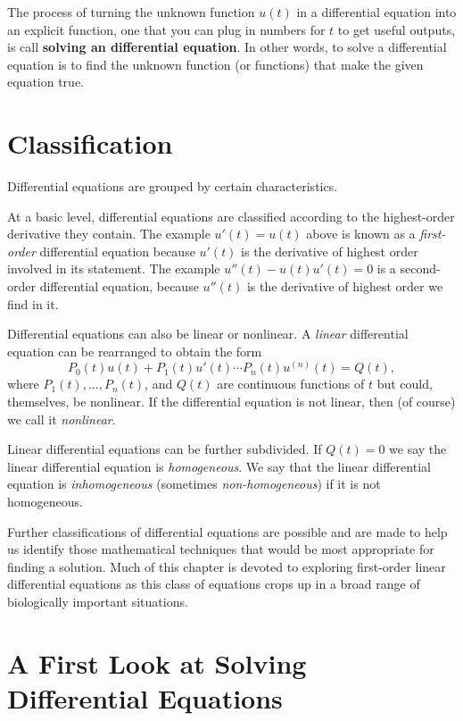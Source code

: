 \documentclass[../book.tex]{subfiles}
\begin{document}
The process of turning the unknown function \(u(t)\) in a differential equation into an explicit function, one that you can plug in numbers for \(t\) to get useful outputs, is call \textbf{solving an differential equation}. In other words, to solve a differential equation is to find the unknown function (or functions) that make the given equation true.

\section{Classification}

Differential equations are grouped by certain characteristics.

At a basic level, differential equations are classified according to the highest-order derivative they contain. The example \(u'(t) = u(t)\) above is known as a \emph{first-order} differential equation because \(u'(t)\) is the derivative of highest order involved in its statement. The example \(u''(t) - u(t)u'(t) =0\) is a second-order differential equation, because \(u''(t)\) is the derivative of highest order we find in it.

Differential equations can also be linear or nonlinear. A \emph{linear} differential equation can be rearranged to obtain the form
\begin{equation}\label{eq:de-3}
P_{0}(t) u(t) + P_{1}(t) u'(t) \cdots P_n(t) u^{(n)}(t) = Q(t),
\end{equation}
where \(P_{1}(t), \ldots, P_{n}(t)\), and \(Q(t)\) are continuous functions of \(t\) but could, themselves, be nonlinear.
If the differential equation is not linear, then (of course) we call it \emph{nonlinear}.

Linear differential equations can be further subdivided. If \(Q(t) = 0\) we say the linear differential equation is \emph{homogeneous}. We say that the linear differential equation is \emph{inhomogeneous} (sometimes \emph{non-homogeneous}) if it is not homogeneous.

Further classifications of differential equations are possible and are made to help us identify those  mathematical techniques that would be most appropriate for finding a solution. Much of this chapter is devoted to exploring first-order linear differential equations as this class of equations crops up in a broad range of biologically important situations.

\section{A First Look at Solving Differential Equations}
\end{document}
